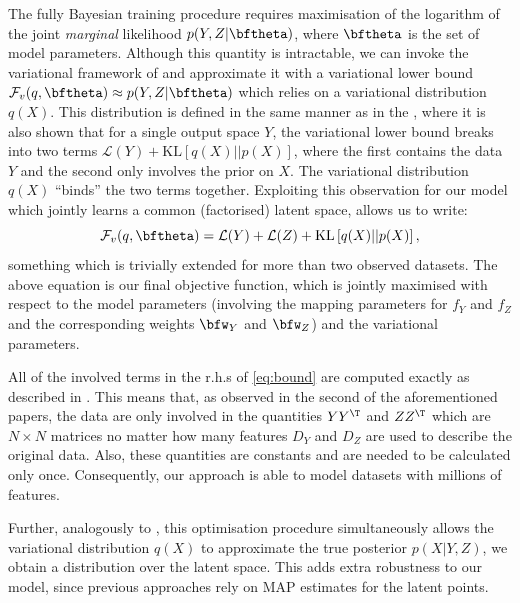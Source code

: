\par The fully Bayesian training procedure requires maximisation of
the logarithm of the joint
\emph{marginal} likelihood $p(Y,Z | \bftheta)$, where $\bftheta$ is the set of model parameters.
Although this quantity is intractable, we can invoke the variational framework of 
\cite{Titsias:bayesGPLVM10,Damianou:vgpds11} and
approximate it with a variational lower bound $\mathcal{F}_v(q,\bftheta) \approx p(Y,Z | \bftheta)$
 which relies on a variational
distribution $q(X)$. This distribution is defined in the same manner as in the \cite{Titsias:bayesGPLVM10,Damianou:vgpds11},
where it is also shown that for a single output space $Y$, the variational lower bound
breaks into two terms 
$\mathcal{L}(Y) + \text{KL}\left[ q(X) || p(X) \right]$, where the first contains
the data $Y$ and the second only involves the prior on $X$. The variational distribution $q(X)$
``binds'' the two terms together. Exploiting this observation for our model which jointly learns
a common (factorised) latent space, allows us to write:
\begin{equation}
\mathcal{F}_v(q,\bftheta) = \mathcal{L}(Y) + \mathcal{L}(Z) + \text{KL} \left[ q(X) || p(X) \right],
\label{eq:bound}
\end{equation}
something which is trivially extended for more than two observed datasets. The above equation is
our final objective function, which is jointly maximised with respect to the model parameters (involving
the mapping parameters for $f_Y$ and $f_Z$ and the corresponding weights $\bfw_Y$ and $\bfw_Z$) and
the variational parameters.

All of the involved terms in the r.h.s of \eqref{eq:bound} are computed exactly as described in \cite{Titsias:bayesGPLVM10,Damianou:vgpds11}.
This means that, as observed in the second of the aforementioned papers, the data are only involved
in the quantities $Y Y^\T$ and $Z Z^\T$ which are $N \times N$ matrices no matter how many features
$D_Y$ and $D_Z$ are used to describe the original data. Also, these quantities are constants and are needed to be
calculated only once. Consequently, our approach is able to model datasets with millions of features.

Further, analogously to \cite{Titsias:bayesGPLVM10,Damianou:vgpds11}, this optimisation procedure simultaneously allows
the variational distribution $q(X)$ to approximate the true posterior $p(X|Y,Z)$, \ie we obtain a distribution
over the latent space. This adds extra robustness to our model, since previous approaches rely on
MAP estimates for the latent points.

